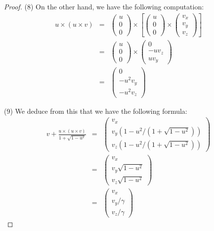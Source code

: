 \documentclass[12pt]{amsbook}
\begin{document}
\begin{proof}
(8) On the other hand, we have the following computation:
\begin{eqnarray*}
u\times(u\times v)
&=&\begin{pmatrix}u\\0\\0\end{pmatrix}\times\left[
\begin{pmatrix}u\\0\\0\end{pmatrix}\times
\begin{pmatrix}v_x\\v_y\\v_z\end{pmatrix}\right]\\
&=&\begin{pmatrix}u\\0\\0\end{pmatrix}\times
\begin{pmatrix}0\\-uv_z\\uv_y\end{pmatrix}\\
&=&\begin{pmatrix}0\\-u^2v_y\\-u^2v_z\end{pmatrix}
\end{eqnarray*}

(9) We deduce from this that we have the following formula:
\begin{eqnarray*}
v+\frac{u\times(u\times v)}{1+\sqrt{1-u^2}}
&=&\begin{pmatrix}v_x\\v_y(1-u^2/(1+\sqrt{1-u^2}))\\v_z(1-u^2/(1+\sqrt{1-u^2}))\end{pmatrix}\\
&=&\begin{pmatrix}v_x\\v_y\sqrt{1-u^2}\\v_z\sqrt{1-u^2}\end{pmatrix}\\
&=&\begin{pmatrix}v_x\\v_y/\gamma\\v_z/\gamma\end{pmatrix}
\end{eqnarray*}


\end{proof}
\end{document}

